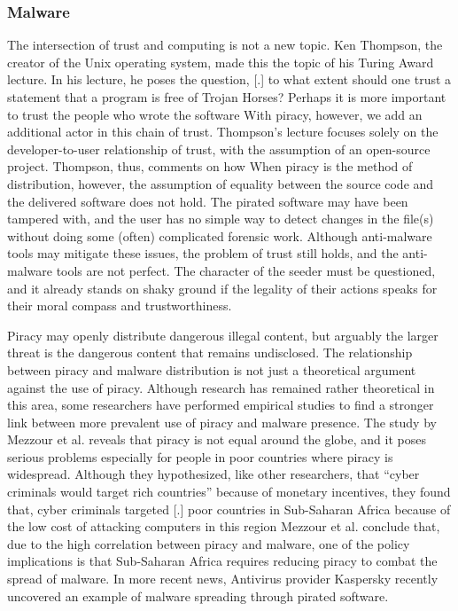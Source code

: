 \documentclass[onecolumn, 12pt]{article}
\begin{document}
\begin{refsection}
\subsubsection{Malware}
The intersection of trust and computing is not a new topic. Ken Thompson, the
creator of the Unix operating system, made this the topic of his Turing Award
lecture. In his lecture, he poses the question,
[.]{%
  to what extent should one trust a statement that
  a program is free of Trojan Horses? Perhaps it is more important to trust the
  people who wrote the software%
} With piracy, however, we add an additional actor in this chain of trust.
Thompson's lecture focuses solely on the developer-to-user relationship of
trust, with the assumption of an open-source project. Thompson, thus, comments
on how  When piracy is the method of distribution, however, the assumption of
equality between the source code and the delivered software does not hold. The
pirated software may have been tampered with, and the user has no simple way to
detect changes in the file(s) without doing some (often) complicated forensic
work. Although anti-malware tools may mitigate these issues, the problem of
trust still holds, and the anti-malware tools are not perfect. The character of
the seeder must be questioned, and it already stands on shaky ground if the
legality of their actions speaks for their moral compass and trustworthiness.

Piracy may openly distribute dangerous illegal content, but arguably the
larger threat is the dangerous content that remains undisclosed. 
The relationship between piracy and malware distribution is not just a
theoretical argument against the use of piracy. Although research has remained
rather theoretical in this area, some researchers have performed empirical
studies to find a stronger link between more prevalent use of piracy and
malware presence. The study by Mezzour et al. reveals that piracy is not equal
around the globe, and it poses serious problems especially for people in
poor countries where piracy is widespread. Although they hypothesized, like
other researchers, that \enquote{cyber criminals would target rich countries}
because of monetary incentives, they found that, cyber criminals targeted
[.]{%
  poor countries in Sub-Saharan Africa because of the low cost of attacking
  computers in this region%
} Mezzour et al. conclude that, due to the high correlation between piracy
and malware, one of the policy implications is that Sub-Saharan Africa requires
reducing piracy to combat the spread of malware.
In more recent news, Antivirus provider Kaspersky recently uncovered an example
of malware spreading through pirated software.~\cite{pcmag:malware} 


\end{refsection}
\end{document}
